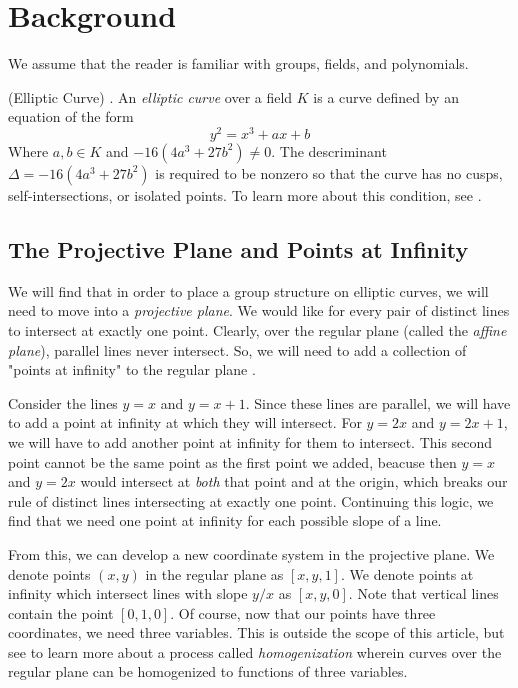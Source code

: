\documentclass[]{../../math_paper}
\begin{document}
\section{Background} \label{sec:background}
We assume that the reader is familiar with groups, fields, and polynomials.

\begin{definition} (Elliptic Curve) \cite{stein2008elementary}. An \emph{elliptic curve} over a field $K$ is a curve defined by an equation of the form
    $$y^2 = x^3 + ax+ b$$
    Where $a, b \in K$ and $-16(4a^3 + 27b^2) \neq 0$. The descriminant $\Delta = -16(4a^3 + 27b^2)$ is required to be nonzero so that the curve has no cusps, self-intersections, or isolated points. To learn more about this condition, see \cite{Silverman:1338326}.
\end{definition}

\subsection{The Projective Plane and Points at Infinity}
We will find that in order to place a group structure on elliptic curves, we will need to move into a \emph{projective plane}. We would like for every pair of distinct lines to intersect at exactly one point. Clearly, over the regular plane (called the \emph{affine plane}), parallel lines never intersect. So, we will need to add a collection of "points at infinity" to the regular plane \cite{Fitchett}.

Consider the lines $y = x$ and $y = x + 1$. Since these lines are parallel, we will have to add a point at infinity at which they will intersect. For $y = 2x$ and $y = 2x + 1$, we will have to add another point at infinity for them to intersect. This second point cannot be the same point as the first point we added, beacuse then $y = x$ and $y = 2x$ would intersect at \emph{both} that point and at the origin, which breaks our rule of distinct lines intersecting at exactly one point. Continuing this logic, we find that we need one point at infinity for each possible slope of a line.

From this, we can develop a new coordinate system in the projective plane. We denote points $(x, y)$ in the regular plane as $[x, y, 1]$. We denote points at infinity which intersect lines with slope $y/x$ as $[x, y, 0]$. Note that vertical lines contain the point $[0, 1, 0]$. Of course, now that our points have three coordinates, we need three variables. This is outside the scope of this article, but see \cite{Fitchett} to learn more about a process called \emph{homogenization} wherein curves over the regular plane can be homogenized to functions of three variables.
\end{document}
